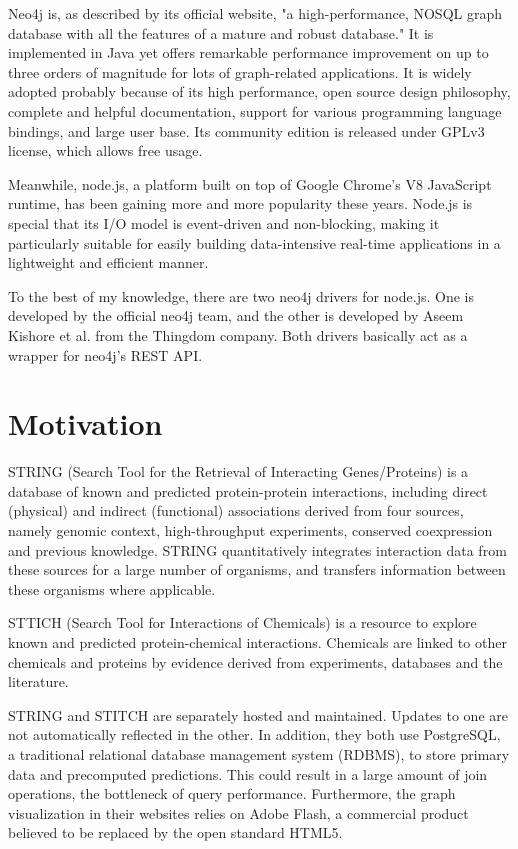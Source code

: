 \documentclass[10pt,conference,compsocconf]{../IEEEtran}
\begin{document}
Neo4j is, as described by its official website, "a high-performance, NOSQL graph database with all the features of a mature and robust database." It is implemented in Java yet offers remarkable performance improvement on up to three orders of magnitude for lots of graph-related applications. It is widely adopted probably because of its high performance, open source design philosophy, complete and helpful documentation, support for various programming language bindings, and large user base. Its community edition is released under GPLv3 license, which allows free usage.

Meanwhile, node.js, a platform built on top of Google Chrome's V8 JavaScript runtime, has been gaining more and more popularity these years. Node.js is special that its I/O model is event-driven and non-blocking, making it particularly suitable for easily building data-intensive real-time applications in a lightweight and efficient manner. 

To the best of my knowledge, there are two neo4j drivers for node.js. One is developed by the official neo4j team, and the other is developed by Aseem Kishore et al. from the Thingdom company. Both drivers basically act as a wrapper for neo4j's REST API.

\section{Motivation}

STRING (Search Tool for the Retrieval of Interacting Genes/Proteins) \citep{1070,1071,1072,1073,1074,1075} is a database of known and predicted protein-protein interactions, including direct (physical) and indirect (functional) associations derived from four sources, namely genomic context, high-throughput experiments, conserved coexpression and previous knowledge. STRING quantitatively integrates interaction data from these sources for a large number of organisms, and transfers information between these organisms where applicable.

STTICH (Search Tool for Interactions of Chemicals) \citep{1068,1069} is a resource to explore known and predicted protein-chemical interactions. Chemicals are linked to other chemicals and proteins by evidence derived from experiments, databases and the literature.

STRING and STITCH are separately hosted and maintained. Updates to one are not automatically reflected in the other. In addition, they both use PostgreSQL, a traditional relational database management system (RDBMS), to store primary data and precomputed predictions. This could result in a large amount of join operations, the bottleneck of query performance. Furthermore, the graph visualization in their websites relies on Adobe Flash, a commercial product believed to be replaced by the open standard HTML5.
\end{document}
